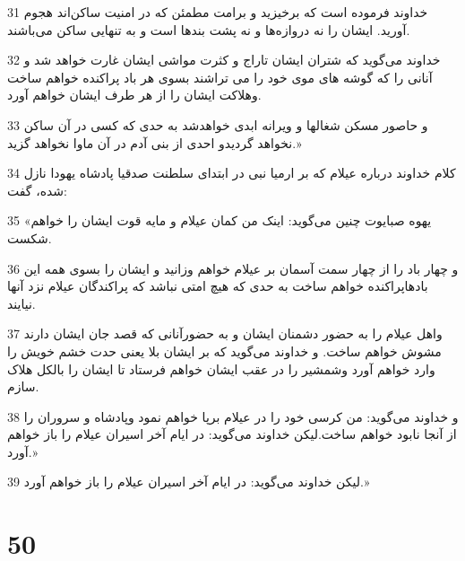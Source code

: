 \par 31 خداوند فرموده است که برخیزید و برامت مطمئن که در امنیت ساکن‌اند هجوم آورید. ایشان را نه دروازه‌ها و نه پشت بندها است و به تنهایی ساکن می‌باشند.
\par 32 خداوند می‌گوید که شتران ایشان تاراج و کثرت مواشی ایشان غارت خواهد شد و آنانی را که گوشه های موی خود را می تراشند بسوی هر باد پراکنده خواهم ساخت وهلاکت ایشان را از هر طرف ایشان خواهم آورد.
\par 33 و حاصور مسکن شغالها و ویرانه ابدی خواهدشد به حدی که کسی در آن ساکن نخواهد گردیدو احدی از بنی آدم در آن ماوا نخواهد گزید.»
\par 34 کلام خداوند درباره عیلام که بر ارمیا نبی در ابتدای سلطنت صدقیا پادشاه یهودا نازل شده، گفت:
\par 35 «یهوه صبایوت چنین می‌گوید: اینک من کمان عیلام و مایه قوت ایشان را خواهم شکست.
\par 36 و چهار باد را از چهار سمت آسمان بر عیلام خواهم وزانید و ایشان را بسوی همه این بادهاپراکنده خواهم ساخت به حدی که هیچ امتی نباشد که پراکندگان عیلام نزد آنها نیایند.
\par 37 واهل عیلام را به حضور دشمنان ایشان و به حضورآنانی که قصد جان ایشان دارند مشوش خواهم ساخت. و خداوند می‌گوید که بر ایشان بلا یعنی حدت خشم خویش را وارد خواهم آورد وشمشیر را در عقب ایشان خواهم فرستاد تا ایشان را بالکل هلاک سازم.
\par 38 و خداوند می‌گوید: من کرسی خود را در عیلام برپا خواهم نمود وپادشاه و سروران را از آنجا نابود خواهم ساخت.لیکن خداوند می‌گوید: در ایام آخر اسیران عیلام را باز خواهم آورد.»
\par 39 لیکن خداوند می‌گوید: در ایام آخر اسیران عیلام را باز خواهم آورد.»
 
\chapter{50}

